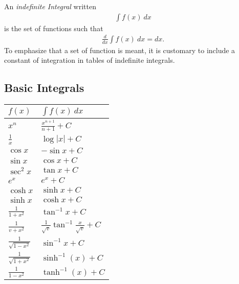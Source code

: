 \begin{df}
	An \emph{indefinite Integral} written
	\begin{align*}
	\int f(x) ~dx
	\end{align*}
	is the set of functions such that
	\begin{align*}
	\frac d {dx} \int f(x)~ dx = dx.
	\end{align*}
	To emphasize that a set of function is meant, it is customary to include a constant of integration in tables of indefinite integrals.
\end{df}

\subsection{Basic Integrals}
\begin{center}
\begin{tabularx}{.5\textwidth}{XX}
	\toprule
	$f(x)$ & $\displaystyle \int f(x) ~dx$ \\
	\toprule 
	$x^n$ & $\displaystyle \frac{x^{n+1}} {n+1} + C$ \\
	$\frac 1 x$ & $\displaystyle \log |x| +C$ \\
	\midrule
	$\cos x$ & $\displaystyle -\sin x+C$ \\
	$\sin x$ & $\displaystyle \cos x + C$ \\
	$\sec^2 x$ & $\displaystyle \tan x + C$ \\
	\midrule
	$e^x$ & $\displaystyle e^x + C$ \\
	\midrule
	$\cosh x$ & $\displaystyle \sinh x+C$ \\
	$\sinh x$ & $\displaystyle \cosh x+C$ \\
	\midrule
	$\displaystyle \frac 1 {1+x^2}$ & $\displaystyle \tan^{-1} x+C$ \\
	$\displaystyle \frac 1 {v+x^2}$ & $\displaystyle \frac 1 {\sqrt v} \tan^{-1} \frac x {\sqrt v} +C$ \\
	$\displaystyle \frac 1 {\sqrt{1-x^2}}$ & $\displaystyle \sin^{-1} x+C$ \\
	\midrule
	$\displaystyle \frac 1 {\sqrt{1+x^2}} $ & $\sinh^{-1}(x) +C$ \\
	$\displaystyle \frac 1 {1-x^2}$ & $\tanh^{-1}(x)+C$ \\
	\bottomrule
\end{tabularx}
\end{center}


